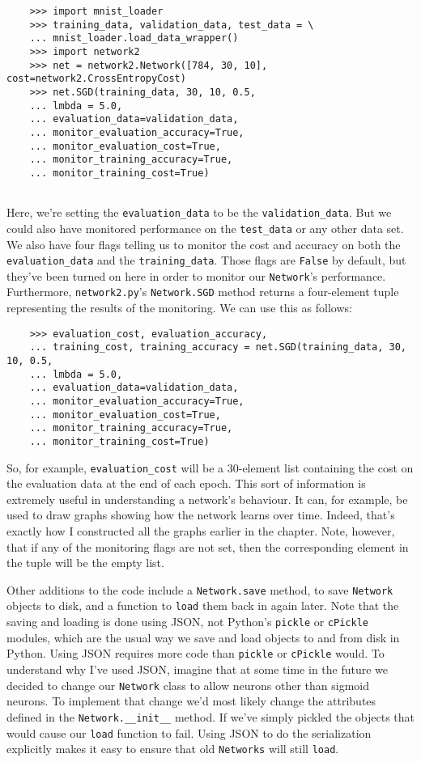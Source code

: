 \begin{lstlisting}
    >>> import mnist_loader
    >>> training_data, validation_data, test_data = \
    ... mnist_loader.load_data_wrapper()
    >>> import network2
    >>> net = network2.Network([784, 30, 10], cost=network2.CrossEntropyCost)
    >>> net.SGD(training_data, 30, 10, 0.5,
    ... lmbda = 5.0,
    ... evaluation_data=validation_data,
    ... monitor_evaluation_accuracy=True,
    ... monitor_evaluation_cost=True,
    ... monitor_training_accuracy=True,
    ... monitor_training_cost=True)
    
\end{lstlisting}
Here, we're setting the \lstinline{evaluation_data} to be the \lstinline{validation_data}. But we could also have monitored performance on the \lstinline{test_data} or any other data set. We also have four flags telling us to monitor the cost and accuracy on both the \lstinline{evaluation_data} and the \lstinline{training_data}. Those flags are \lstinline{False} by default, but they've been turned on here in order to monitor our \lstinline{Network}'s performance. Furthermore, \lstinline{network2.py}'s \lstinline{Network.SGD} method returns a four-element tuple representing the results of the monitoring. We can use this as follows:
\begin{lstlisting}
    >>> evaluation_cost, evaluation_accuracy, 
    ... training_cost, training_accuracy = net.SGD(training_data, 30, 10, 0.5,
    ... lmbda = 5.0,
    ... evaluation_data=validation_data,
    ... monitor_evaluation_accuracy=True,
    ... monitor_evaluation_cost=True,
    ... monitor_training_accuracy=True,
    ... monitor_training_cost=True)
\end{lstlisting}
So, for example, \lstinline{evaluation_cost} will be a 30-element list containing the cost on the evaluation data at the end of each epoch. This sort of information is extremely useful in understanding a network's behaviour. It can, for example, be used to draw graphs showing how the network learns over time. Indeed, that's exactly how I constructed all the graphs earlier in the chapter. Note, however, that if any of the monitoring flags are not set, then the corresponding element in the tuple will be the empty list.

Other additions to the code include a \lstinline{Network.save} method, to save \lstinline{Network} objects to disk, and a function to \lstinline{load} them back in again later. Note that the saving and loading is done using JSON, not Python's \lstinline{pickle} or \lstinline{cPickle} modules, which are the usual way we save and load objects to and from disk in Python. Using JSON requires more code than \lstinline{pickle} or \lstinline{cPickle} would. To understand why I've used JSON, imagine that at some time in the future we decided to change our \lstinline{Network} class to allow neurons other than sigmoid neurons. To implement that change we'd most likely change the attributes defined in the \lstinline{Network.__init__} method. If we've simply pickled the objects that would cause our \lstinline{load} function to fail. Using JSON to do the serialization explicitly makes it easy to ensure that old \lstinline{Networks} will still \lstinline{load}.

